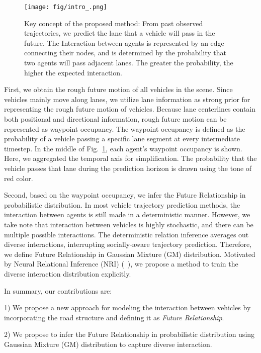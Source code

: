 \documentclass{article} \usepackage{iclr2023_conference,times}
\begin{document}
\begin{figure}
  \centering
  \hspace*{-0.0\linewidth}\texttt{[image: fig/intro\_.png]}
  \vspace{-5pt}
  \caption{Key concept of the proposed method: From past observed trajectories, we predict the lane that a vehicle will pass in the future.
  The Interaction between agents is represented by an edge connecting their nodes, and is determined by the probability that two agents will pass adjacent lanes. 
  The greater the probability, the higher the expected interaction.}
  \label{fig:intro}
  \vspace{-10pt}
\end{figure}


First, we obtain the rough future motion of all vehicles in the scene.
Since vehicles mainly move along lanes, we utilize lane information as strong prior for representing the rough future motion of vehicles.
Because lane centerlines contain both positional and directional information, rough future motion can be represented as waypoint occupancy.
The waypoint occupancy is defined as the probability of a vehicle passing a specific lane segment at every intermediate timestep.
In the middle of Fig.~\ref{fig:intro}, each agent's waypoint occupancy is shown.
Here, we aggregated the temporal axis for simplification.
The probability that the vehicle passes that lane during the prediction horizon is drawn using the tone of red color.

Second, based on the waypoint occupancy, we infer the Future Relationship in probabilistic distribution.
In most vehicle trajectory prediction methods, the interaction between agents is still made in a deterministic manner.
However, we take note that interaction between vehicles is highly stochastic, and there can be multiple possible interactions.
The deterministic relation inference averages out diverse interactions, interrupting socially-aware trajectory prediction.
Therefore, we define Future Relationship in Gaussian Mixture (GM) distribution.
Motivated by Neural Relational Inference (NRI) (~\cite{kipf2018neural}), we propose a method to train the diverse interaction distribution explicitly.

In summary, our contributions are:

1) We propose a new approach for modeling the interaction between vehicles by incorporating the road structure and defining it as \textit{Future Relationship}.

2) We propose to infer the Future Relationship in probabilistic distribution using Gaussian Mixture (GM) distribution to capture diverse interaction.
\end{document}
